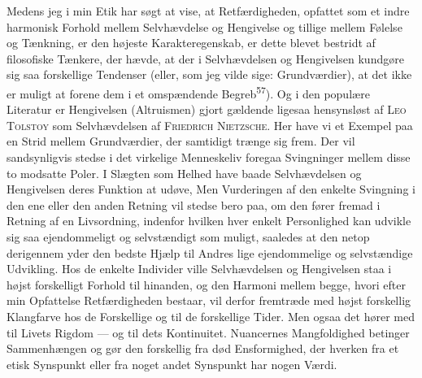 \documentclass[12pt,a4paper,openany]{book}
\begin{document}
Medens jeg i min Etik har søgt at vise, at Retfærdigheden, opfattet som et
indre harmonisk Forhold mellem Selvhævdelse og Hengivelse og tillige mellem
Følelse og Tænkning, er den højeste Karakteregenskab, er dette blevet bestridt
af filosofiske Tænkere, der hævde, at der i Selvhævdelsen og Hengivelsen
kundgøre sig saa forskellige Tendenser (eller, som jeg vilde sige:
Grundværdier), at det ikke er muligt at forene dem i et omspændende
Begreb\textsuperscript{57}). Og i den populære Literatur er Hengivelsen
(Altruismen) gjort gældende ligesaa hensynsløst af \textsc{Leo Tolstoy} som
Selvhævdelsen af \textsc{Friedrich Nietzsche}. Her have vi et Exempel paa en
Strid mellem Grundværdier, der samtidigt trænge sig frem. Der vil sandsynligvis
stedse i det virkelige Menneskeliv foregaa Svingninger mellem disse to modsatte
Poler. I Slægten som Helhed have baade Selvhævdelsen og Hengivelsen deres
Funktion at udøve, Men Vurderingen af den enkelte Svingning i den ene eller den
anden Retning vil stedse bero paa, om den fører fremad i Retning af en
Livsordning, indenfor hvilken hver enkelt Personlighed kan udvikle sig saa
ejendommeligt og selvstændigt som muligt, saaledes at den netop derigennem yder
den bedste Hjælp til Andres lige ejendommelige og selvstændige Udvikling. Hos
de enkelte Individer ville Selvhævdelsen og Hengivelsen staa i højst
forskelligt Forhold til hinanden, og den Harmoni mellem begge, hvori efter min
Opfattelse Retfærdigheden bestaar, vil derfor fremtræde med højst forskellig
Klangfarve hos de Forskellige og til de forskellige Tider. Men ogsaa det hører
med til Livets Rigdom --- og til dets Kontinuitet. Nuancernes Mangfoldighed
betinger Sammenhængen og gør den forskellig fra død Ensformighed, der hverken
fra et etisk Synspunkt eller fra noget andet Synspunkt har nogen Værdi.
\end{document}
